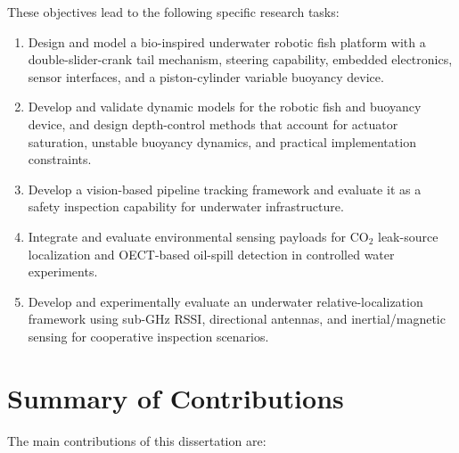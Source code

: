 \documentclass{uhcoethesis}
\begin{document}
These objectives lead to the following specific research tasks:

\begin{enumerate}
\item Design and model a bio-inspired underwater robotic fish platform with a double-slider-crank tail mechanism, steering capability, embedded electronics, sensor interfaces, and a piston-cylinder variable buoyancy device.
\item Develop and validate dynamic models for the robotic fish and buoyancy device, and design depth-control methods that account for actuator saturation, unstable buoyancy dynamics, and practical implementation constraints.
\item Develop a vision-based pipeline tracking framework and evaluate it as a safety inspection capability for underwater infrastructure.
\item Integrate and evaluate environmental sensing payloads for \mbox{CO$_2$} leak-source localization and OECT-based oil-spill detection in controlled water experiments.
\item Develop and experimentally evaluate an underwater relative-localization framework using sub-GHz RSSI, directional antennas, and inertial/magnetic sensing for cooperative inspection scenarios.
\end{enumerate}

\section{Summary of Contributions}

The main contributions of this dissertation are:
\end{document}
